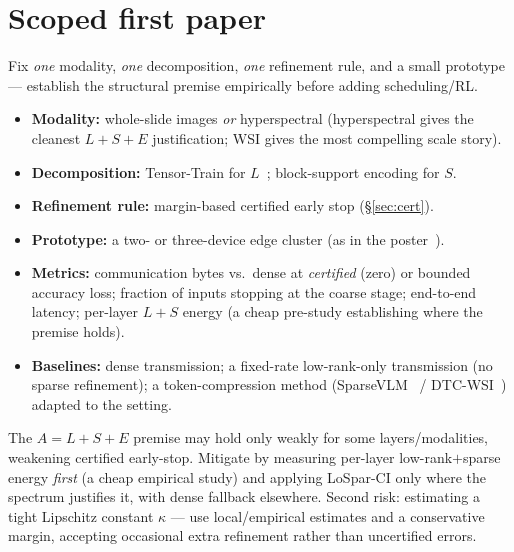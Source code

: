 \documentclass[11pt]{article}
\newcommand{\term}[1]{\textbf{\color{accent!85!black}#1}}
\begin{document}
\section{Scoped first paper}

\begin{claimbox}
Fix \emph{one} modality, \emph{one} decomposition, \emph{one} refinement rule, and a small
prototype --- establish the structural premise empirically before adding scheduling/RL.
\end{claimbox}

\begin{itemize}[leftmargin=1.5em,itemsep=2pt]
\item \term{Modality:} whole-slide images \emph{or} hyperspectral (hyperspectral gives the
cleanest $L+S+E$ justification; WSI gives the most compelling scale story).
\item \term{Decomposition:} Tensor-Train for $L$~\cite{tt}; block-support encoding for $S$.
\item \term{Refinement rule:} margin-based certified early stop (\S\ref{sec:cert}).
\item \term{Prototype:} a two- or three-device edge cluster (as in the poster~\cite{poster}).
\item \term{Metrics:} communication bytes vs.\ dense at \emph{certified} (zero) or bounded
accuracy loss; fraction of inputs stopping at the coarse stage; end-to-end latency;
per-layer $L{+}S$ energy (a cheap pre-study establishing where the premise holds).
\item \term{Baselines:} dense transmission; a fixed-rate low-rank-only transmission (no sparse
refinement); a token-compression method (SparseVLM~\cite{sparsevlm} / DTC-WSI~\cite{dtcwsi})
adapted to the setting.
\end{itemize}

\begin{riskbox}
The $A=L+S+E$ premise may hold only weakly for some layers/modalities, weakening certified
early-stop. Mitigate by measuring per-layer low-rank$+$sparse energy \emph{first} (a cheap
empirical study) and applying LoSpar-CI only where the spectrum justifies it, with dense
fallback elsewhere. Second risk: estimating a tight Lipschitz constant $\kappa$ --- use
local/empirical estimates and a conservative margin, accepting occasional extra refinement
rather than uncertified errors.
\end{riskbox}
\end{document}
